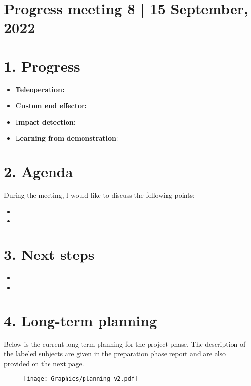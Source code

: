 \documentclass[11pt]{report}
\numberwithin{equation}{section}        %
\numberwithin{figure}{section}          %
\numberwithin{table}{section}           %
\begin{document}
  \section*{Progress meeting 8 | 15 September, 2022}


  \section*{1. Progress}
  \begin{itemize}
  \item \textbf{Teleoperation:} 
    
  \item \textbf{Custom end effector:} 
    
  \item \textbf{Impact detection:} 

  \item \textbf{Learning from demonstration:} 
    
  \end{itemize}

  \section*{2. Agenda}
  During the meeting, I would like to discuss the following points:

  \begin{itemize}
      \item  
      \item 
  \end{itemize}

  \section*{3. Next steps}

  \begin{itemize}
      \item  
      \item 
  \end{itemize}

  \section*{4. Long-term planning}
  Below is the current long-term planning for the project phase. The description of the labeled subjects are given in the preparation phase report and are also provided on the next page.

  \begin{figure}[H]
  \centering
  \texttt{[image: Graphics/planning v2.pdf]}

  \label{fig:my_label}
  \end{figure}
\end{document}
